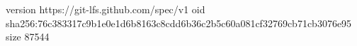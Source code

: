 version https://git-lfs.github.com/spec/v1
oid sha256:76c383317c9b1e0e1d6b8163c8cdd6b36c2b5c60a081cf32769cb71cb3076e95
size 87544
